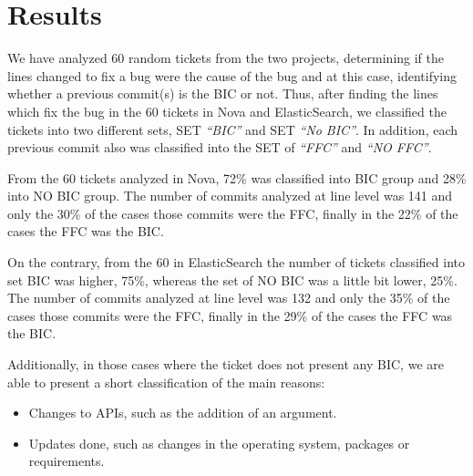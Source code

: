 \documentclass[conference]{IEEEtran}
\begin{document}
\section{Results}
\label{sec:results}
We have analyzed 60 random tickets from the two projects, determining if the lines changed to fix a bug were the cause of the bug and at this case, identifying whether a previous commit(s) is the BIC or not. Thus, after finding the lines which fix the bug in the 60 tickets in Nova and ElasticSearch, we classified the tickets into two different sets, SET \textit{``BIC''} and SET \textit{``No BIC''}. In addition, each previous commit also was classified into the SET of \textit{``FFC''} and \textit{``NO FFC''}.


From the 60 tickets analyzed in Nova, 72\% was classified into BIC group and 28\% into NO BIC group. The number of commits analyzed at line level was 141 and only the 30\% of the cases those commits were the FFC, finally in the 22\% of the cases the FFC was the BIC.

On the contrary, from the 60 in ElasticSearch the number of tickets classified into set BIC was higher, 75\%, whereas the set of NO BIC was a little bit lower, 25\%. The number of commits analyzed at line level was 132 and only the 35\% of the cases those commits were the FFC, finally in the 29\% of the cases the FFC was the BIC.



Additionally, in those cases where the ticket does not present any BIC, we are able to present a short classification of the main reasons:
\begin{itemize}
  \item Changes to APIs, such as the addition of an argument. 
  \item Updates done, such as changes in the operating system, packages or requirements.
\end{itemize}
\end{document}
